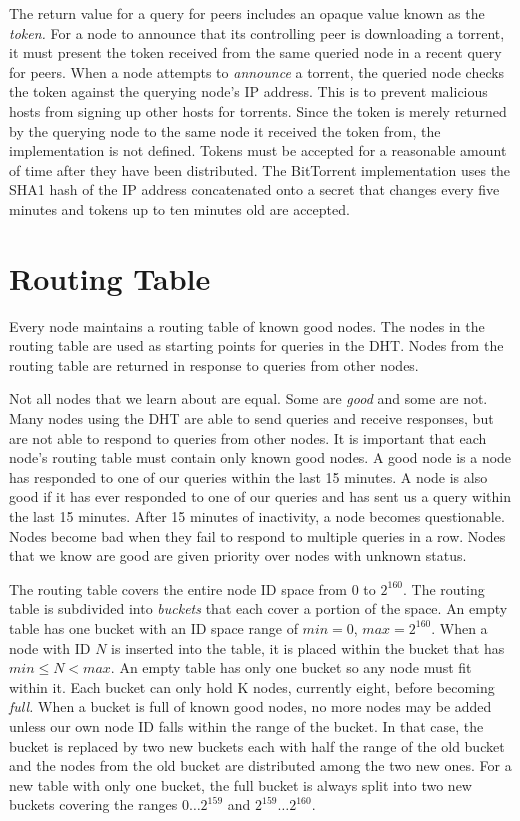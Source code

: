 \documentclass{article}
\begin{document}
The return value for a query for peers includes an opaque value known as the {\em token.} For a node to announce that its controlling peer is downloading a torrent, it must present the token received from the same queried node in a recent query for peers. When a node attempts to {\em announce} a torrent, the queried node checks the token against the querying node's IP address. This is to prevent malicious hosts from signing up other hosts for torrents. Since the token is merely returned by the querying node to the same node it received the token from, the implementation is not defined. Tokens must be accepted for a reasonable amount of time after they have been distributed. The BitTorrent implementation uses the SHA1 hash of the IP address concatenated onto a secret that changes every five minutes and tokens up to ten minutes old are accepted.

{\section {Routing Table}}

Every node maintains a routing table of known good nodes. The nodes in the routing table are used as starting points for queries in the DHT. Nodes from the routing table are returned in response to queries from other nodes.

Not all nodes that we learn about are equal. Some are {\em good} and some are not. Many nodes using the DHT are able to send queries and receive responses, but are not able to respond to queries from other nodes. It is important that each node's routing table must contain only known good nodes. A good node is a node has responded to one of our queries within the last 15 minutes. A node is also good if it has ever responded to one of our queries and has sent us a query within the last 15 minutes. After 15 minutes of inactivity, a node becomes questionable. Nodes become bad when they fail to respond to multiple queries in a row. Nodes that we know are good are given priority over nodes with unknown status.

The routing table covers the entire node ID space from $0$ to $2^{160}$. The routing table is subdivided into {\em buckets} that each cover a portion of the space. An empty table has one bucket with an ID space range of $min=0$, $max=2^{160}$. When a node with ID $N$ is inserted into the table, it is placed within the bucket that has $min \leq N < max$. An empty table has only one bucket so any node must fit within it. Each bucket can only hold K nodes, currently eight, before becoming {\em full.} When a bucket is full of known good nodes, no more nodes may be added unless our own node ID falls within the range of the bucket. In that case, the bucket is replaced by two new buckets each with half the range of the old bucket and the nodes from the old bucket are distributed among the two new ones. For a new table with only one bucket, the full bucket is always split into two new buckets covering the ranges $0\ldots 2^{159}$ and $2^{159}\ldots 2^{160}$.
\end{document}

